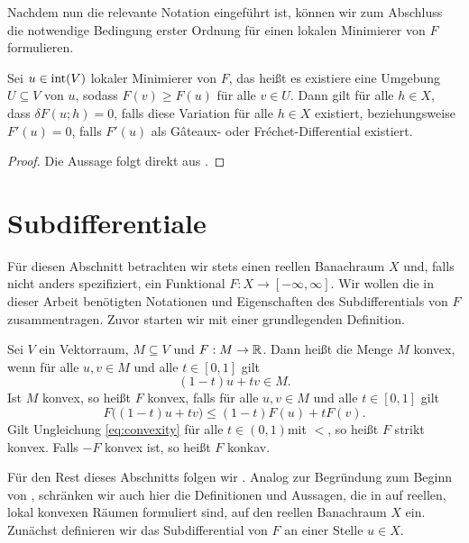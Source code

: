Nachdem nun die relevante Notation eingeführt ist, können wir zum Abschluss
die notwendige Bedingung erster Ordnung für einen lokalen Minimierer von $F$
formulieren.

\begin{theorem}
  \label{thm:necessaryConditionFreeLocalExtrema}
  Sei $u\in \operatorname{int}(V)$ lokaler Minimierer von $F$, das heißt es existiere
  eine Umgebung $U\subseteq V$ von $u$, sodass $F(v)\geq F(u)$ für alle $v\in
  U$. 
  Dann gilt für alle $h\in X$, dass $\delta F(u;h) = 0$, falls diese Variation
  für alle $h\in X$ existiert, beziehungsweise $F'(u) = 0$, falls $F'(u)$ als
  G\^ateaux- oder Fr\'echet-Differential existiert.
\end{theorem}

\begin{proof}
  Die Aussage folgt direkt aus \cite[S. 193 f., Theorem 40.A, Theorem
  40.B]{Zei85}.
\end{proof}


\section{Subdifferentiale}

Für diesen Abschnitt betrachten wir stets einen reellen Banachraum $X$ und,
falls nicht anders spezifiziert, ein Funktional $F:X\to [-\infty,\infty]$.
Wir wollen die in dieser Arbeit benötigten Notationen und
Eigenschaften des Subdifferentials von $F$ zusammentragen.
Zuvor starten wir mit einer grundlegenden Definition.

\begin{definition}
  Sei $V$ ein Vektorraum, $M\subseteq V$ und $F:M\to\mathbb{R}$. 
  Dann heißt die Menge $M$ konvex, wenn für alle $u,v\in M$ und alle $t\in
  [0,1]$ gilt $$(1-t)u+tv\in M.$$
  Ist $M$ konvex, so heißt $F$ konvex, falls für alle $u,v\in M$ und alle
  $t\in[0,1]$ gilt 
  \begin{equation}
    \label{eq:convexity}
    F\big( (1-t)u+tv\big)\leq (1-t)F(u)+t F(v).
  \end{equation}
  Gilt Ungleichung \eqref{eq:convexity} für alle $t\in
  (0,1)$mit \glqq$<$\grqq, so heißt $F$ strikt konvex. 
  Falls $-F$ konvex ist, so heißt $F$ konkav.
\end{definition}

Für den Rest dieses Abschnitts folgen wir \cite[S. 385-397]{Zei85}. 
Analog zur Begründung zum Beginn von , schränken
wir auch hier die Definitionen und Aussagen, die in \cite{Zei85} auf reellen,
lokal konvexen Räumen formuliert sind, auf den reellen Banachraum $X$ ein.
Zunächst definieren wir das Subdifferential von $F$ an einer Stelle $u\in X$.

